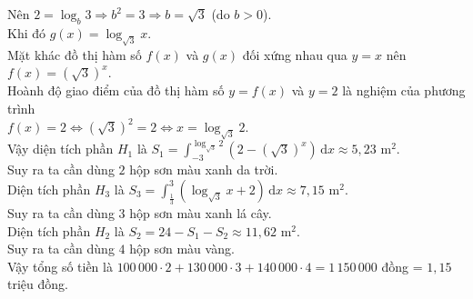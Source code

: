 \begin{bt}
{		Nên $2 = \log_{b}3 \Rightarrow b^2 = 3 \Rightarrow  b = \sqrt{3}$ (do $b > 0$).\\
		Khi đó  $g(x) = \log_{\sqrt{3}}x$.\\
		Mặt khác đồ thị hàm số  $f(x)$ và $g(x)$ đối xứng nhau qua $y = x$ nên $f(x) = \left(\sqrt{3} \right)^x$.\\
		Hoành  độ giao điểm của đồ thị hàm số $y = f(x)$ và $y = 2$ là nghiệm của phương trình\\ $f(x) = 2 \Leftrightarrow \left(\sqrt{3} \right)^2 = 2 \Leftrightarrow x = \log_{\sqrt{3}}2$.\\
		Vậy diện  tích phần $H_1$ là $S_1 = \displaystyle\int_{-3}^{\log_{\sqrt{3}}2} \left(2 - \left(\sqrt{3} \right)^x \right)\mathrm{\,d}x \approx 5{,}23$ m$^2$.\\
		Suy ra ta cần dùng $2$ hộp sơn  màu xanh da trời.\\
		Diện tích phần $H_3$ là $S_3 = \displaystyle\int_{\frac{1}{3}}^3 \left(\log_{\sqrt{3}}x + 2 \right)  \mathrm{\,d}x \approx 7{,}15$ m$^2$.\\
		Suy ra ta cần dùng $3$ hộp sơn màu  xanh lá cây.\\
		Diện tích phần $H_2$ là $S_2 = 24 - S_1 - S_2 \approx 11{,}62$  m$^2$.\\
		Suy ra ta cần dùng $4$ hộp  sơn màu vàng.\\
		Vậy tổng số tiền là $100\,000 \cdot 2 + 130\,000 \cdot 3 + 140\,000 \cdot 4  = 1\,150\,000$ đồng = $1{,}15$ triệu đồng.
	} 
\end{bt}

